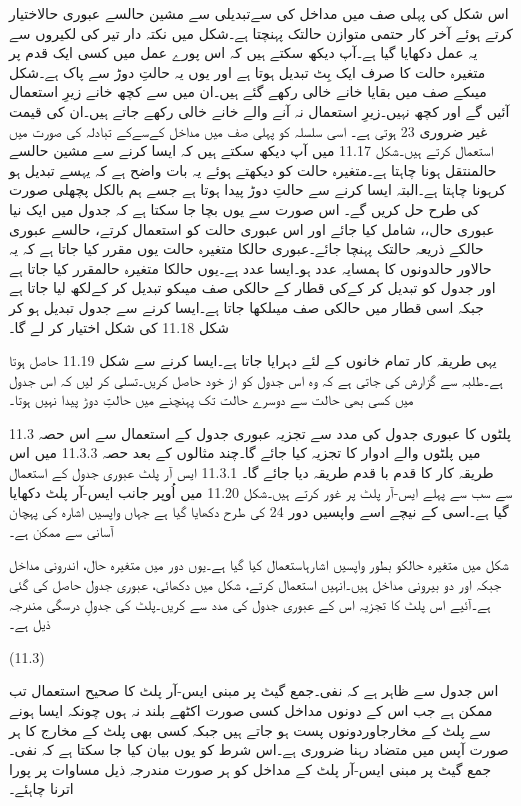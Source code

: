 	اس شکل کی پہلی صف میں مداخل کی سےتبدیلی سے مشین حالسے عبوری حالاختیار کرتے ہوئے آخر کار حتمی متوازن حالتک پہنچتا ہے۔شکل میں نکتہ دار تیر کی لکیروں سے یہ عمل دکھایا گیا ہے۔آپ دیکھ سکتے ہیں کہ اس پورے عمل میں کسی ایک قدم پر متغیرہ حالت کا صرف ایک بِٹ تبدیل ہوتا ہے اور یوں یہ حالتِ دوڑ سے پاک ہے۔شکل میںکے صف میں بقایا خانے خالی رکھے گئے ہیں۔ان میں سے کچھ خانے زیرِ استعمال آئیں گے اور کچھ نہیں۔زیرِ استعمال نہ آنے والے خانے خالی رکھے جاتے ہیں۔ان کی قیمت غیر ضروری 23 ہوتی ہے۔
	اسی سلسلہ کو پہلی صف میں مداخل کےسےکے تبادلہ کی صورت میں استعمال کرتے ہیں۔شکل 11.17 میں آپ دیکھ سکتے ہیں کہ ایسا کرنے سے مشین حالسے حالمنتقل ہونا چاہتا ہے۔متغیرہ حالت کو دیکھتے ہوئے یہ بات واضح ہے کہ یہسے تبدیل ہو کرہونا چاہتا ہے۔البتہ ایسا کرنے سے حالتِ دوڑ پیدا ہوتا ہے جسے ہم بالکل پچھلی صورت کی طرح حل کریں گے۔
	اس صورت سے یوں بچا جا سکتا ہے کہ جدول میں ایک نیا عبوری حال،، شامل کیا جائے اور اس عبوری حالت کو استعمال کرتے، حالسے عبوری حالکے ذریعہ حالتک پہنچا جائے۔عبوری حالکا متغیرہ حالت یوں مقرر کیا جاتا ہے کہ یہ حالاور حالدونوں کا ہمسایہ عدد ہو۔ایسا عدد ہے۔یوں حالکا متغیرہ حالمقرر کیا جاتا ہے اور جدول کو تبدیل کر کےکی قطار کے حالکی صف میںکو تبدیل کر کےلکھ لیا جاتا ہے جبکہ اسی قطار میں حالکی صف میںلکھا جاتا ہے۔ایسا کرنے سے جدول تبدیل ہو کر شکل 11.18 کی شکل اختیار کر لے گا۔

	یہی طریقہ کار تمام خانوں کے لئے دہرایا جاتا ہے۔ایسا کرنے سے شکل 11.19 حاصل ہوتا ہے۔طلبہ سے گزارش کی جاتی ہے کہ وہ اس جدول کو از خود حاصل کریں۔تسلی کر لیں کہ اس جدول میں کسی بھی حالت سے دوسرے حالت تک پہنچنے میں حالتِ دوڑ پیدا نہیں ہوتا۔


11.3 پلٹوں کا عبوری جدول کی مدد سے تجزیہ
	عبوری جدول کے استعمال سے اس حصہ میں پلٹوں والے ادوار کا تجزیہ کیا جائے گا۔چند مثالوں کے بعد حصہ 11.3.3 میں اس طریقہ کار کا قدم با قدم طریقہ دیا جائے گا۔
11.3.1 ایس آر پلٹ
	عبوری جدول کے استعمال سے  سب سے پہلے ایس-آر پلٹ پر غور کرتے ہیں۔شکل 11.20 میں اُوپر جانب ایس-آر پلٹ دکھایا گیا ہے۔اسی کے نیچے اسے واپسیں دور 24 کی طرح دکھایا گیا ہے جہاں واپسیں اشارہ کی پہچان آسانی سے ممکن ہے۔


	شکل میں متغیرہ حالکو بطور واپسیں اشارہاستعمال کیا گیا ہے۔یوں دور میں متغیرہ حال، اندرونی مداخل جبکہ اور  دو بیرونی مداخل ہیں۔انہیں استعمال کرتے، شکل میں دکھائی، عبوری جدول حاصل کی گئی ہے۔آئیے اس پلٹ کا تجزیہ اس کے عبوری جدول کی مدد سے کریں۔پلٹ کی جدولِ درسگی مندرجہ ذیل ہے۔

 
(11.3)

	اس جدول سے ظاہر ہے کہ نفی۔جمع گیٹ پر مبنی ایس-آر پلٹ کا صحیح استعمال تب ممکن ہے جب اس کے دونوں مداخل کسی صورت اکٹھے بلند نہ ہوں چونکہ ایسا ہونے سے پلٹ کے مخارجاوردونوں پست ہو جاتے ہیں جبکہ کسی بھی پلٹ کے مخارج کا ہر صورت آپس میں متضاد رہنا ضروری ہے۔اس شرط کو یوں بیان کیا جا سکتا ہے کہ نفی۔جمع گیٹ پر مبنی ایس-آر پلٹ کے مداخل کو ہر صورت مندرجہ ذیل مساوات پر پورا اترنا چاہئے۔

